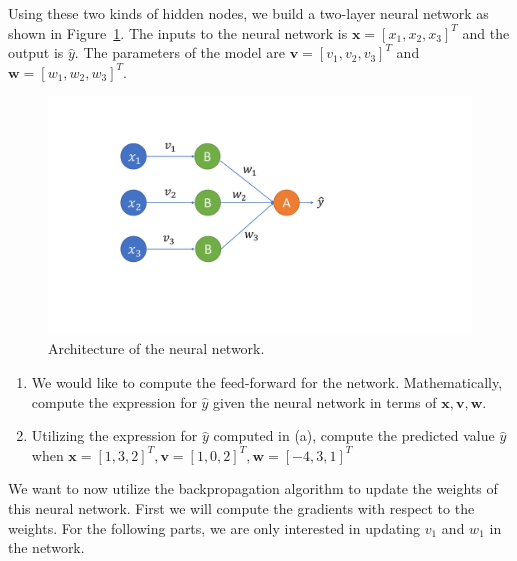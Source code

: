 Using these two kinds of hidden nodes, we build a two-layer neural network as shown in Figure~\ref{fig:nn-network}. The inputs to the neural network is $\mathbf{x} = [x_1, x_2, x_3]^T$ and the output is $\hat{y}$. The parameters of the model are $\mathbf{v} = [v_1, v_2, v_3]^T$ and $\mathbf{w} = [w_1, w_2, w_3]^T$.

\begin{figure}[h]
    \centering
    \includegraphics[width=.5\linewidth]{hw2-images/neural-network.pdf}
    \caption{Architecture of the neural network.}
    \label{fig:nn-network}
\end{figure}

\begin{enumerate}
    \item {}
    We would like to compute the feed-forward for the network. Mathematically, compute the expression for $\hat{y}$ given the neural network in terms of $\mathbf{x}, \mathbf{v}, \mathbf{w}$.
    
    \solution{
      \[
        \hat{y} = w_1(x_1^{v_1}) + w_2(x_2^{v_2})+w_3(x_3^{v_3})
      \]
    }
    
    \item {}
    Utilizing the expression for $\hat{y}$ computed in (a), compute the predicted value $\hat{y}$ when $\mathbf{x} = [1,3,2]^T, \mathbf{v}=[1,0,2]^T, \mathbf{w}=[-4,3,1]^T$

    \solution{
      \[
        \hat{y} = -4(1) + 3(1) + 1(4) = 3
      \]
    }
    
    
\end{enumerate}

We want to now utilize the backpropagation algorithm to update the weights of this neural network. First we will compute the gradients with respect to the weights. For the following parts, we are only interested in updating $v_1$ and $w_1$ in the network.

